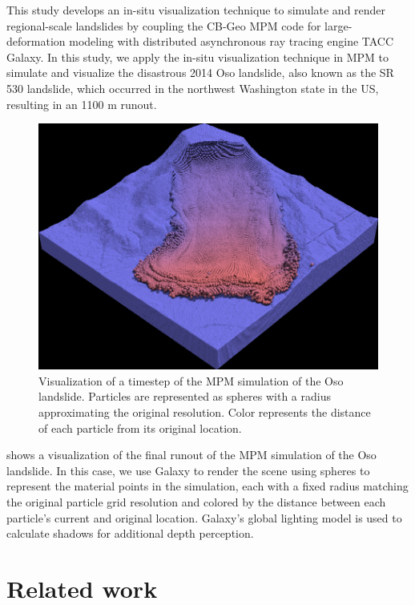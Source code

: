 \documentclass[journal]{IEEEtran}
\begin{document}
This study develops an in-situ visualization technique to simulate and render regional-scale landslides by coupling the CB-Geo MPM code for large-deformation modeling with distributed asynchronous ray tracing engine TACC Galaxy. In this study, we apply the in-situ visualization technique in MPM to simulate and visualize the disastrous 2014 Oso landslide, also known as the SR 530 landslide, which occurred in the northwest Washington state in the US, resulting in an 1100 m runout. 

\begin{figure}[!htbp]
    \centering
    \includegraphics[width=\linewidth]{figs/osofull.png}
    \caption{Visualization of a timestep of the MPM simulation of the Oso landslide.   Particles are represented as spheres with a radius approximating the original resolution.  Color represents the distance of each particle from its original location.} 
    \label{fig:osofull}
\end{figure}

 shows a visualization of the final runout of the MPM simulation of the Oso landslide.   In this case, we use Galaxy to render the scene using spheres to represent the material points in the simulation, each with a fixed radius matching the original particle grid resolution and colored by the distance between each particle's current and original location.  Galaxy's global lighting model is used to calculate shadows for additional depth perception.

\section{Related work}
\end{document}

